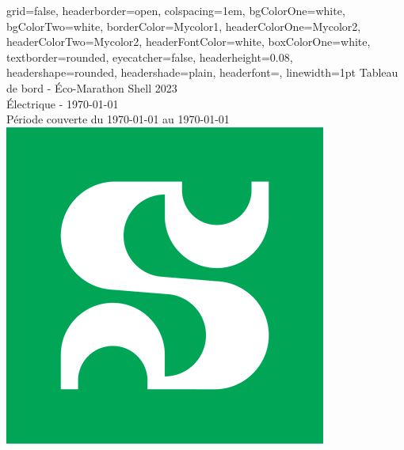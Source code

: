 \documentclass[a0paper,portrait]{baposter}
\begin{document}

\begin{poster}
{
grid=false,
headerborder=open, %
colspacing=1em, %
bgColorOne=white, %
bgColorTwo=white, %
borderColor=Mycolor1, %
headerColorOne=Mycolor2, %
headerColorTwo=Mycolor2, %
headerFontColor=white, %
boxColorOne=white, %
textborder=rounded, %
eyecatcher=false, %
headerheight=0.08\textheight, %
headershape=rounded, %
headershade=plain,
headerfont=\Large\textsf, %
linewidth=1pt %
}
{}
%
%
{\textsf{{Tableau de bord - Éco-Marathon Shell 2023}}} %
{\sf\vspace{0.1em}\\
Électrique  -  {\AdvanceDate[0]\today} 
\vspace{0.1em}\\
\small{ Période couverte du {\AdvanceDate[-7]\today} au {\AdvanceDate[0]\today}
}
}
{\includegraphics[width=.1\linewidth]{img/udes.png}} %


\end{poster}
\end{document}
